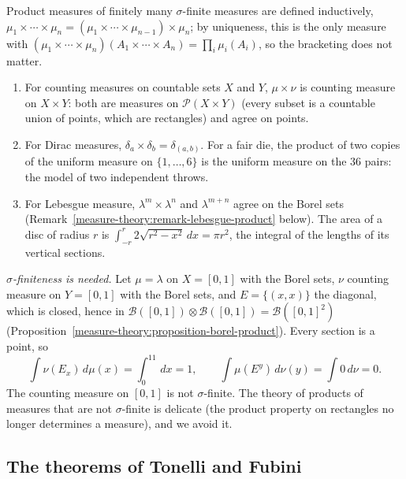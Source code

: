 Product measures of finitely many $\sigma$-finite measures are defined inductively, $\mu_1 \times \cdots \times \mu_n = (\mu_1 \times \cdots \times \mu_{n-1}) \times \mu_n$; by uniqueness, this is the only
measure with $(\mu_1 \times \cdots \times \mu_n)(A_1 \times \cdots \times A_n) = \prod_i\mu_i(A_i)$, so the bracketing does not matter.

\begin{example}\label{measure-theory:example-product-measures}
\begin{enumerate}
\item For counting measures on countable sets $X$ and $Y$, $\mu \times \nu$ is counting measure on $X \times Y$: both are measures on $\mathcal{P}(X \times Y)$ (every subset is a countable union of
points, which are rectangles) and agree on points.
\item For Dirac measures, $\delta_a \times \delta_b = \delta_{(a, b)}$. For a fair die, the product of two copies of the uniform measure on $\{1, \ldots, 6\}$ is the uniform measure on the $36$ pairs:
the model of two independent throws.
\item For Lebesgue measure, $\lambda^m \times \lambda^n$ and $\lambda^{m+n}$ agree on the Borel sets (Remark~\ref{measure-theory:remark-lebesgue-product} below). The area of a disc of radius $r$ is
$\int_{-r}^r2\sqrt{r^2 - x^2}\,dx = \pi r^2$, the integral of the lengths of its vertical sections.
\end{enumerate}
\end{example}

\begin{counterexample}\label{measure-theory:counterexample-product-sigma-finite}
\emph{$\sigma$-finiteness is needed.} Let $\mu = \lambda$ on $X = [0, 1]$ with the Borel sets, $\nu$ counting measure on $Y = [0, 1]$ with the Borel sets, and $E = \{(x, x)\}$ the diagonal, which is
closed, hence in $\mathcal{B}([0, 1]) \otimes \mathcal{B}([0, 1]) = \mathcal{B}([0, 1]^2)$ (Proposition~\ref{measure-theory:proposition-borel-product}). Every section is a point, so
\[
\int\nu(E_x)\,d\mu(x) = \int_0^11\,dx = 1, \qquad \int\mu(E^y)\,d\nu(y) = \int0\,d\nu = 0.
\]
The counting measure on $[0, 1]$ is not $\sigma$-finite. The theory of products of measures that are not $\sigma$-finite is delicate (the product property on rectangles no longer determines a
measure), and we avoid it.
\end{counterexample}

\subsection{The theorems of Tonelli and Fubini}\label{measure-theory:subsection-tonelli-fubini}

